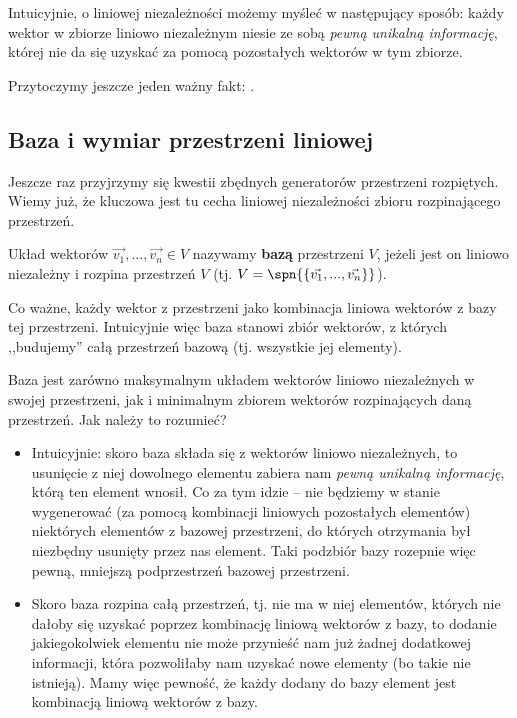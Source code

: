 Intuicyjnie, o liniowej niezależności możemy myśleć w następujący sposób: każdy wektor w zbiorze liniowo niezależnym niesie ze sobą \textit{pewną unikalną informację}, której nie da się uzyskać za pomocą pozostałych wektorów w tym zbiorze.

Przytoczymy jeszcze jeden ważny fakt: .

\subsection{Baza i wymiar przestrzeni liniowej}

Jeszcze raz przyjrzymy się kwestii zbędnych generatorów przestrzeni rozpiętych. Wiemy już, że kluczowa jest tu cecha liniowej niezależności zbioru rozpinającego przestrzeń.

Układ wektorów $\vec{v_1}, ..., \vec{v_n} \in V$ nazywamy \textbf{bazą} przestrzeni $V$, jeżeli jest on liniowo niezależny i rozpina przestrzeń $V$ (tj. $V = \spn{\{\vec{v_1}, ..., \vec{v_n}\}}$).

Co ważne, każdy wektor z przestrzeni  jako kombinacja liniowa wektorów z bazy tej przestrzeni. Intuicyjnie więc baza stanowi zbiór wektorów, z których ,,budujemy'' całą przestrzeń bazową (tj. wszystkie jej elementy).

Baza jest zarówno maksymalnym układem wektorów liniowo niezależnych w swojej przestrzeni, jak i minimalnym zbiorem wektorów rozpinających daną przestrzeń. Jak należy to rozumieć?
\begin{itemize}
	\item {} Intuicyjnie: skoro baza składa się z wektorów liniowo niezależnych, to usunięcie z niej dowolnego elementu zabiera nam \textit{pewną unikalną informację}, którą ten element wnosił. Co za tym idzie -- nie będziemy w stanie wygenerować (za pomocą kombinacji liniowych pozostałych elementów) niektórych elementów z bazowej przestrzeni, do których otrzymania był niezbędny usunięty przez nas element. Taki podzbiór bazy rozepnie więc pewną, mniejszą podprzestrzeń bazowej przestrzeni.
	
	\item {} Skoro baza rozpina całą przestrzeń, tj. nie ma w niej elementów, których nie dałoby się uzyskać poprzez kombinację liniową wektorów z bazy, to dodanie jakiegokolwiek elementu nie może przynieść nam już żadnej dodatkowej informacji, która pozwoliłaby nam uzyskać nowe elementy (bo takie nie istnieją). Mamy więc pewność, że każdy dodany do bazy element jest kombinacją liniową wektorów z bazy.
\end{itemize}


